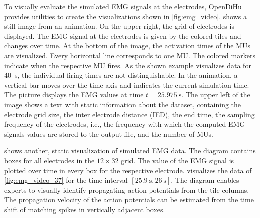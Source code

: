To visually evaluate the simulated EMG signals at the electrodes, OpenDiHu provides utilities to create the visualizations shown in \cref{fig:emg_video}.  shows a still image from an animation. On the upper right, the grid of electrodes is displayed. The EMG signal at the electrodes is given by the colored tiles and changes over time. At the bottom of the image, the activation times of the MUs are visualized. Every horizontal line corresponds to one MU. The colored markers indicate when the respective MU fires. As the shown example visualizes data for \SI{40}{\s}, the individual firing times are not distinguishable. In the animation, a vertical bar moves over the time axis and indicates the current simulation time. The picture displays the EMG values at time $t=\SI{25.975}{\s}$. The upper left of the image shows a text with static information about the dataset, containing the electrode grid size, the inter electrode distance (IED), the end time, the sampling frequency of the electrodes, i.e., the frequency with which the computed EMG signals values are stored to the output file, and the number of MUs.

 shows another, static visualization of simulated EMG data. The diagram contains boxes for all electrodes in the $12\times 32$ grid. The value of the EMG signal is plotted over time in every box for the respective electrode.  visualizes the data of \cref{fig:emg_video_37} for the time interval $[\SI{25.9}{\s},\SI{26}{\s}]$.
The diagram enables experts to visually identify propagating action potentials from the tile columns. The propagation velocity of the action potentials can be estimated from the time shift of matching spikes in vertically adjacent boxes.

